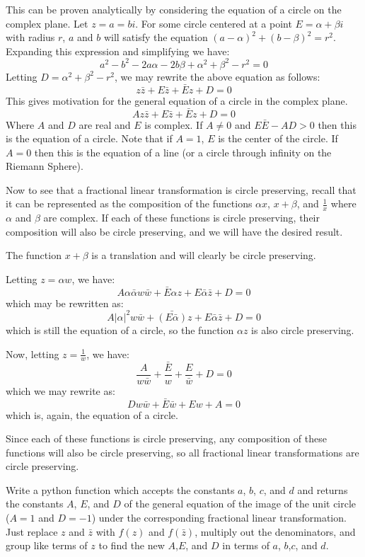 This can be proven analytically by considering the equation of a circle on the complex plane.
Let $z=a=bi$.
For some circle centered at a point $E=\alpha + \beta i$ with radius $r$, $a$ and $b$ will satisfy the equation $(a-\alpha)^2+(b-\beta)^2=r^2$.
Expanding this expression and simplifying we have:
$$a^2-b^2-2a\alpha-2b\beta+\alpha^2+\beta^2-r^2=0$$
Letting $D=\alpha^2+\beta^2-r^2$, we may rewrite the above equation as follows:
$$z\bar{z}+E\bar{z}+\bar{E}z+D=0$$
This gives motivation for the general equation of a circle in the complex plane.
$$Az\bar{z}+E\bar{z}+\bar{E}z+D=0$$
Where $A$ and $D$ are real and $E$ is complex.
If $A\neq 0$ and $E\bar{E}-AD>0$ then this is the equation of a circle.
Note that if $A=1$, $E$ is the center of the circle.
If $A=0$ then this is the equation of a line (or a circle through infinity on the Riemann Sphere).

Now to see that a fractional linear transformation is circle preserving, recall that it can be represented as the composition of the functions $\alpha x$, $x+\beta$, and $\frac{1}{x}$ where $\alpha$ and $\beta$ are complex.
If each of these functions is circle preserving, their composition will also be circle preserving, and we will have the desired result. 

The function $x+\beta$ is a translation and will clearly be circle preserving.

Letting $z=\alpha w$, we have: 
$$A\alpha \bar{\alpha} w\bar{w}+\bar{E}\alpha z+E\bar{\alpha} \bar{z}+D=0$$
which may be rewritten as:
$$A|\alpha|^2 w\bar{w}+\bar{(E\bar{\alpha})}z+E\bar{\alpha} \bar{z}+D=0$$
which is still the equation of a circle, so the function $\alpha z$ is also circle preserving.

Now, letting $z=\frac{1}{w}$, we have:
$$\frac{A}{w\bar{w}}+\frac{\bar{E}}{w}+\frac{E}{\bar{w}}+D=0$$
which we may rewrite as:
$$Dw\bar{w}+\bar{E}\bar{w}+Ew+A=0$$
which is, again, the equation of a circle.

Since each of these functions is circle preserving, any composition of these functions will also be circle preserving, so all fractional linear transformations are circle preserving.

\begin{problem}
Write a python function which accepts the constants $a$, $b$, $c$, and $d$ and returns the constants $A$, $E$, and $D$ of the general equation of the image of the unit circle ($A = 1$ and $D = -1$) under the corresponding fractional linear transformation. Just replace $z$ and $\bar{z}$ with $f(z)$ and $f(\bar{z})$, multiply out the denominators, and group like terms of $z$ to find the new $A$,$E$, and $D$ in terms of $a$, $b$,$c$, and $d$.
\end{problem}

